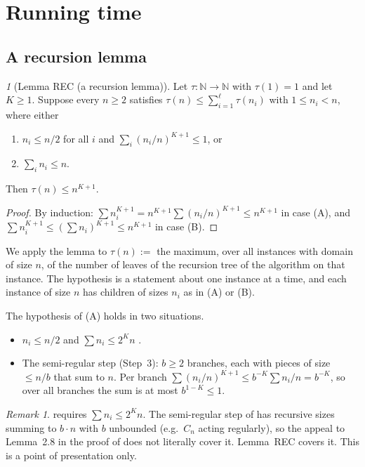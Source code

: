 \documentclass[11pt]{article}
\newenvironment{enumlab}[2][]{\begin{enumerate}\renewcommand{\theenumi}{#1#2{enumi}}%
  \renewcommand{\labelenumi}{(\theenumi)}}{\end{enumerate}}
\theoremstyle{plain}
\theoremstyle{definition}
\theoremstyle{remark}
\newtheorem{remark}[theorem]{Remark}
\theoremstyle{named}
\newtheorem*{named}{}
\theoremstyle{namedrm}
\begin{document}
\section{Running time}\label{sec:time}

\subsection{A recursion lemma}

\begin{named}[Lemma REC (a recursion lemma)]
Let $\tau\colon\mathbb N\to\mathbb N$ with $\tau(1)=1$ and let $K\ge1$. Suppose every $n\ge2$ satisfies
$\tau(n)\le\sum_{i=1}^\ell\tau(n_i)$ with $1\le n_i<n$, where either
\begin{enumlab}{\Alph}
\item $n_i\le n/2$ for all $i$ and $\sum_i(n_i/n)^{K+1}\le1$, or
\item $\sum_in_i\le n$.
\end{enumlab}
Then $\tau(n)\le n^{K+1}$.
\end{named}
\begin{proof}
By induction: $\sum n_i^{K+1}=n^{K+1}\sum(n_i/n)^{K+1}\le n^{K+1}$ in case (A), and
$\sum n_i^{K+1}\le(\sum n_i)^{K+1}\le n^{K+1}$ in case (B).
\end{proof}
We apply the lemma to $\tau(n):=$ the maximum, over all instances with domain of size $n$, of the
number of leaves of the recursion tree of the algorithm on that instance. The hypothesis is a statement
about one instance at a time, and each instance of size $n$ has children of sizes $n_i$ as in (A) or (B).

The hypothesis of (A) holds in two situations.
\begin{itemize}
\item $n_i\le n/2$ and $\sum n_i\le2^Kn$ \cite[Lemma~2.6]{GNS}.
\item The semi-regular step (Step~3): $b\ge2$ branches, each with pieces of size $\le n/b$ that sum to $n$.
  Per branch $\sum(n_i/n)^{K+1}\le b^{-K}\sum n_i/n=b^{-K}$, so over all branches the sum is at most
  $b^{1-K}\le1$.
\end{itemize}

\begin{remark}\label{rem:gap2}
\cite[Lemma~2.8]{GNS} requires $\sum n_i\le2^Kn$. The semi-regular step of \cite[Alg.~4]{GNS} has
recursive sizes summing to $b\cdot n$ with $b$ unbounded (e.g.\ $C_n$ acting regularly), so the appeal to
Lemma~2.8 in the proof of \cite[Thm.~7.3]{GNS} does not literally cover it. Lemma~REC
covers it. This is a point of presentation only.
\end{remark}
\end{document}

